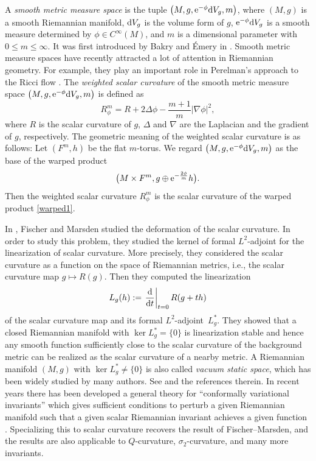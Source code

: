 \documentclass[pdftex]{sigma}
\numberwithin{equation}{section}
\begin{document}
A \textit{smooth metric measure space} is the tuple $\bigl(M,g,{\rm e}^{-\phi}{\rm d}V_g,m\bigr)$, where $(M,g)$ is a smooth Riemannian manifold, ${\rm d}V_g$ is the volume form of $g$, ${\rm e}^{-\phi}{\rm d}V_g$ is a smooth measure determined by $\phi\in C^\infty(M)$, and $m$ is a dimensional parameter with $0\leq m\leq \infty$. It was first introduced by Bakry and \'{E}mery in \cite{Bakry&Emery}. Smooth metric measure spaces have recently attracted a lot of attention in Riemannian geometry. For example, they play an important role in Perelman's approach to the Ricci flow \cite{Perelman}.
The \textit{weighted scalar curvature} of the smooth metric measure space $\bigl(M,g,{\rm e}^{-\phi}{\rm d}V_g,m\bigr)$ is defined as
\begin{equation}\label{wsc}
 R_\phi^m=R+2\Delta \phi-\frac{m+1}{m}|\nabla \phi|^2,
\end{equation}
where $R$ is the scalar curvature of $g$, $\Delta$ and $\nabla$ are the Laplacian and the gradient of $g$, respectively. The geometric meaning of the weighted scalar curvature is as follows: Let $(F^m,h)$ be the flat $m$-torus. We regard $\bigl(M,g,{\rm e}^{-\phi}{\rm d}V_g,m\bigr)$ as the base of the warped product
\begin{equation}\label{warped1}
 \bigl(M\times F^m,g\oplus {\rm e}^{-\frac{2\phi}{m}}h\bigr).
\end{equation}
Then the weighted scalar curvature $R_\phi^m$ is the scalar curvature of the warped product \eqref{warped1}.

In \cite{Fischer&Marsden}, Fischer and Marsden studied
the deformation of the scalar curvature. In order to study this problem, they studied the kernel of formal $L^2$-adjoint for the linearization of scalar curvature. More precisely, they considered the scalar curvature as a function on the space of Riemannian metrics, i.e.,
the scalar curvature map $g\mapsto R(g)$.
Then they computed the linearization
\[L_g(h):= \left.\frac{{\rm d}}{{\rm d}t}\right|_{t=0}R(g+th)\]
of the scalar curvature map and its formal $L^2$-adjoint~$L_g^*$. They showed that a closed Riemannian manifold with $\ker L_g^*= \{0\}$ is linearization stable and hence any smooth function sufficiently close to the scalar curvature of the background metric can be realized as the scalar curvature of a nearby metric.
A Riemannian manifold $(M,g)$ with $\ker L_g^*\neq \{0\}$ is also called \textit{vacuum static space}, which has been widely studied by many authors. See \cite{Corvino1,Corvino&Eichmair&Miao, Corvino&Schoen, Kobayashi, Qing&Yuan1, Qing&Yuan2} and the references therein.
In recent years there has been developed a general theory for ``conformally variational invariants''
which gives sufficient conditions to perturb a given Riemannian manifold such that a given scalar
Riemannian invariant achieves a given function \cite{Case&Lin&Yuan1,Case&Lin&Yuan2}.
Specializing this to scalar curvature recovers the result of Fischer--Marsden, and the results are
also applicable to $Q$-curvature, $\sigma_2$-curvature, and many more invariants.
\end{document}
